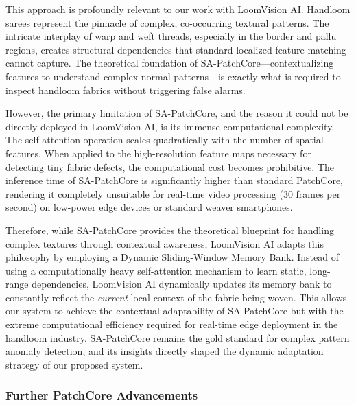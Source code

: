\documentclass{ieeeaccess}
\begin{document}
This approach is profoundly relevant to our work with LoomVision AI. Handloom sarees represent the pinnacle of complex, co-occurring textural patterns. The intricate interplay of warp and weft threads, especially in the border and pallu regions, creates structural dependencies that standard localized feature matching cannot capture. The theoretical foundation of SA-PatchCore---contextualizing features to understand complex normal patterns---is exactly what is required to inspect handloom fabrics without triggering false alarms.

However, the primary limitation of SA-PatchCore, and the reason it could not be directly deployed in LoomVision AI, is its immense computational complexity. The self-attention operation scales quadratically with the number of spatial features. When applied to the high-resolution feature maps necessary for detecting tiny fabric defects, the computational cost becomes prohibitive. The inference time of SA-PatchCore is significantly higher than standard PatchCore, rendering it completely unsuitable for real-time video processing (30 frames per second) on low-power edge devices or standard weaver smartphones.

Therefore, while SA-PatchCore provides the theoretical blueprint for handling complex textures through contextual awareness, LoomVision AI adapts this philosophy by employing a Dynamic Sliding-Window Memory Bank. Instead of using a computationally heavy self-attention mechanism to learn static, long-range dependencies, LoomVision AI dynamically updates its memory bank to constantly reflect the \textit{current} local context of the fabric being woven. This allows our system to achieve the contextual adaptability of SA-PatchCore but with the extreme computational efficiency required for real-time edge deployment in the handloom industry. SA-PatchCore remains the gold standard for complex pattern anomaly detection, and its insights directly shaped the dynamic adaptation strategy of our proposed system.

\subsubsection{Further PatchCore Advancements}
\end{document}
